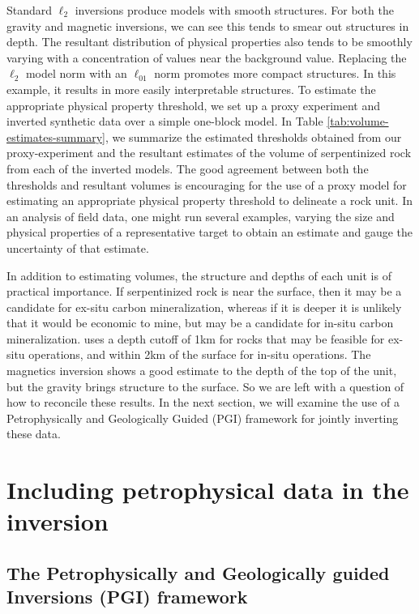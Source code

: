 \documentclass[
    paper,
  ]{geophysics}
\begin{document}
Standard $\ell_2$ inversions produce models with smooth structures. For both the gravity and magnetic inversions, we can see this tends to smear out structures in depth. The resultant distribution of physical properties also tends to be smoothly varying with a concentration of values near the background value. Replacing the $\ell_2$ model norm with an $\ell_{01}$ norm promotes more compact structures. In this example, it results in more easily interpretable structures. To estimate the appropriate physical property threshold, we set up a proxy experiment and inverted synthetic data over a simple one-block model. In Table \ref{tab:volume-estimates-summary}, we summarize the estimated thresholds obtained from our proxy-experiment and the resultant estimates of the volume of serpentinized rock from each of the inverted models. The good agreement between both the thresholds and resultant volumes is encouraging for the use of a proxy model for estimating an appropriate physical property threshold to delineate a rock unit. In an analysis of field data, one might run several examples, varying the size and physical properties of a representative target to obtain an estimate and gauge the uncertainty of that estimate.




In addition to estimating volumes, the structure and depths of each unit is of practical importance. If serpentinized rock is near the surface, then it may be a candidate for ex-situ carbon mineralization, whereas if it is deeper it is unlikely that it would be economic to mine, but may be a candidate for in-situ carbon mineralization. \cite{Mitchinson2020} uses a depth cutoff of 1km for rocks that may be feasible for ex-situ operations, and within 2km of the surface for in-situ operations. The magnetics inversion shows a good estimate to the depth of the top of the unit, but the gravity brings structure to the surface. So we are left with a question of how to reconcile these results. In the next section, we will examine the use of a Petrophysically and Geologically Guided (PGI) framework for jointly inverting these data.






\section{Including petrophysical data in the inversion}
\subsection{The Petrophysically and Geologically guided Inversions (PGI) framework}
\end{document}

